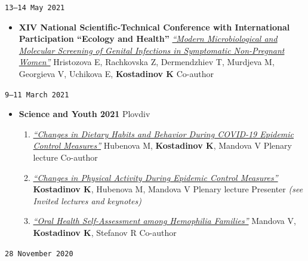 \documentclass[
  10.5pt,
  a4paper,
  DIV=11,
  numbers=noendperiod]{scrartcl}
\providecommand{\tightlist}{%
  \setlength{\itemsep}{0pt}\setlength{\parskip}{0pt}}
\let\oldtexttt\texttt
\renewcommand{\texttt}[1]{{\color{cvbronze}\small\oldtexttt{#1}}}
\begin{document}
\texttt{13–14\ May\ 2021}

\begin{itemize}
\tightlist
\item
  \textbf{XIV National Scientific-Technical Conference with
  International Participation ``Ecology and Health''} \textbar{}
  \emph{\href{https://hst.bg/ECOLOGY\%20AND\%20HEALTH\%202021.pdf}{``Modern
  Microbiological and Molecular Screening of Genital Infections in
  Symptomatic Non-Pregnant Women''}} \textbar{} Hristozova E, Rachkovska
  Z, Dermendzhiev T, Murdjeva M, Georgieva V, Uchikova E,
  \textbf{Kostadinov K} \textbar{} Co-author
\end{itemize}

\texttt{9–11\ March\ 2021}

\begin{itemize}
\tightlist
\item
  \textbf{Science and Youth 2021} \textbar{} Plovdiv

  \begin{enumerate}
  \def\labelenumi{\arabic{enumi}.}
  \tightlist
  \item
    \emph{\href{https://www.asclepius.bg/images/nm2021/\%D0\%9F\%D0\%A0\%D0\%9E\%D0\%93\%D0\%A0\%D0\%90\%D0\%9C\%D0\%90-\%D0\%9D\%D0\%90\%D0\%A3\%D0\%9A\%D0\%90-\%D0\%98-\%D0\%9C\%D0\%9B\%D0\%90\%D0\%94\%D0\%9E\%D0\%A1\%D0\%A2-2021.pdf}{``Changes
    in Dietary Habits and Behavior During COVID-19 Epidemic Control
    Measures''}} \textbar{} Hubenova M, \textbf{Kostadinov K}, Mandova V
    \textbar{} Plenary lecture \textbar{} Co-author
  \item
    \emph{\href{https://www.asclepius.bg/images/nm2021/\%D0\%9F\%D0\%A0\%D0\%9E\%D0\%93\%D0\%A0\%D0\%90\%D0\%9C\%D0\%90-\%D0\%9D\%D0\%90\%D0\%A3\%D0\%9A\%D0\%90-\%D0\%98-\%D0\%9C\%D0\%9B\%D0\%90\%D0\%94\%D0\%9E\%D0\%A1\%D0\%A2-2021.pdf}{``Changes
    in Physical Activity During Epidemic Control Measures''}} \textbar{}
    \textbf{Kostadinov K}, Hubenova M, Mandova V \textbar{} Plenary
    lecture \textbar{} Presenter \emph{(see Invited lectures and
    keynotes)}
  \item
    \emph{\href{https://asclepius.bg/cnm/wp-content/uploads/2022/05/Sbornik-Nauka-i-Mladost-2021.pdf}{``Oral
    Health Self-Assessment among Hemophilia Families''}} \textbar{}
    Mandova V, \textbf{Kostadinov K}, Stefanov R \textbar{} Co-author
  \end{enumerate}
\end{itemize}

\texttt{28\ November\ 2020}
\end{document}
